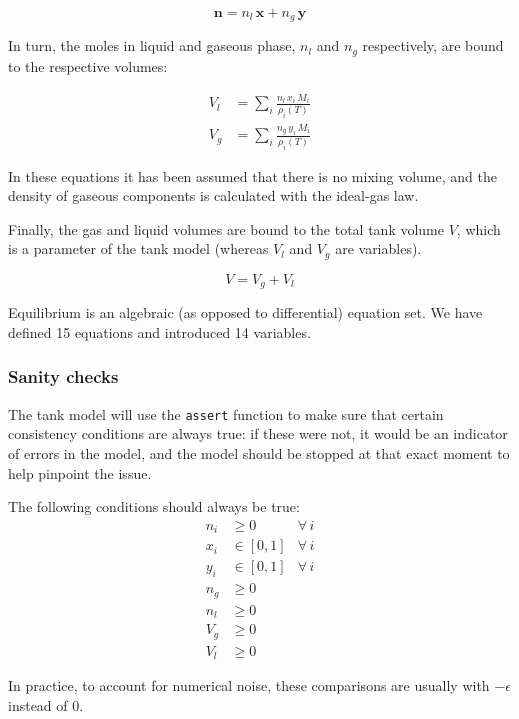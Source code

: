 \documentclass[a4paper]{article}
\begin{document}
\begin{equation}
\mathbf{n} = n_l\,\mathbf{x} + n_g\,\mathbf{y}
\end{equation}

In turn, the moles in liquid and gaseous phase,  $n_l$ and $n_g$ respectively,
are bound to the respective volumes:

\begin{align}
V_l &= \sum_i \frac{n_l \, x_i \, M_i}{\rho_i(T)}\\
V_g &= \sum_i \frac{n_g \, y_i \, M_i}{\rho_i(T)}
\end{align}

In these equations it has been assumed that there is no mixing volume, and the
density of gaseous components is calculated with the ideal-gas law.

Finally, the gas and liquid volumes are bound to the total tank volume $V$,
which is a parameter of the tank model (whereas $V_l$ and $V_g$ are variables).

\begin{equation}
V = V_g + V_l
\end{equation}

Equilibrium is an algebraic (as opposed to differential) equation set. We have
defined 15 equations and introduced 14 variables.

\subsubsection{Sanity checks}
The tank model will use the \texttt{assert} function to make sure that certain
consistency conditions are always true: if these were not, it would be an
indicator of errors in the model, and the model should be stopped at that exact
moment to help pinpoint the issue.

The following conditions should always be true:
\begin{align}
n_i & \geq 0 & \forall \, i\\
x_i & \in [0,1] & \forall \, i\\
y_i & \in [0,1] & \forall \, i\\
n_g & \geq 0\\
n_l & \geq 0\\
V_g & \geq 0\\
V_l & \geq 0
\end{align}

In practice, to account for numerical noise, these comparisons are usually
with $-\epsilon$ instead of 0.
\end{document}
